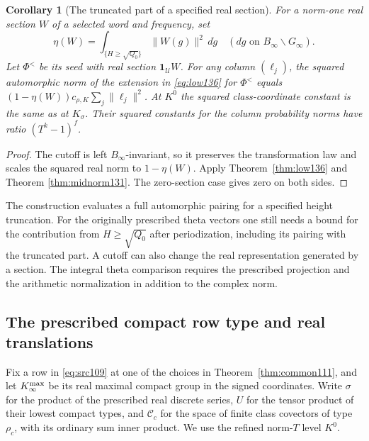 \documentclass[a4paper,11pt]{article}
\newtheorem{corollary}[proposition]{Corollary}
\theoremstyle{definition}
\theoremstyle{remark}
\numberwithin{equation}{section}
\begin{document}
\begin{corollary}[The truncated part of a specified real section]
\label{cor:cut136}
For a norm-one real section \(W\) of a selected word and
frequency, set
\[
    \eta(W)=\int_{\{H\ge\sqrt{Q_0}\}}\|W(g)\|^2\,d\dot g
         \quad (d\dot g\text{ on } B_\infty\backslash G_\infty).
\]
Let \(\Phi^{<}\) be its seed with real section
\(\mathbf1_{\mathcal U}W\). For any column \((\ell_j)\), the
squared automorphic norm of the extension in
\eqref{eq:low136} for \(\Phi^{<}\) equals
\((1-\eta(W))c_{\rho,K}\sum_j\|\ell_j\|^2\). At \(K^0\) the
squared class-coordinate constant is the same as at \(K_\sigma\).
Their squared constants for the column probability norms have
ratio \((T^k-1)^f\).
\end{corollary}
\begin{proof}
The cutoff is left \(B_\infty\)-invariant, so it preserves
the transformation law and scales the squared real norm to
\(1-\eta(W)\). Apply Theorem~\ref{thm:low136} and Theorem \ref{thm:midnorm131}. The zero-section case gives zero on both sides.
\end{proof}

The construction evaluates a full automorphic pairing for a
specified height truncation. For the originally prescribed theta
vectors one still needs a bound for the contribution from
\(H\ge\sqrt{Q_0}\) after periodization, including its pairing
with the truncated part. A cutoff can also change the real
representation generated by a section. The integral theta
comparison requires the prescribed projection and the
arithmetic normalization in addition to the complex norm.

\subsection{The prescribed compact row type and real translations}\label{nav:VII-21}
Fix a row in \eqref{eq:src109} at one of the choices in
Theorem~\ref{thm:common111}, and let \(K_\infty^{\rm max}\)
be its real maximal compact group in the signed coordinates.
Write \(\sigma\) for the product of the prescribed real discrete
series, \(U\) for the tensor product of their lowest compact
types, and \(\mathcal C_c\) for the space of finite class
covectors of type \(\rho_c\), with its ordinary sum inner product.
We use the refined norm-\(T\) level \(K^0\).
\end{document}
